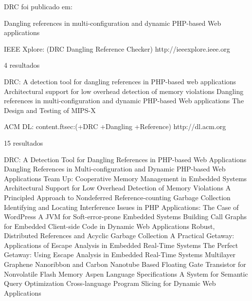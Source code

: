 DRC foi publicado em:

Dangling references in multi-configuration and dynamic PHP-based Web applications

IEEE Xplore: (DRC Dangling Reference Checker)
http://ieeexplore.ieee.org

4 resultados

DRC: A detection tool for dangling references in PHP-based web applications
Architectural support for low overhead detection of memory violations
Dangling references in multi-configuration and dynamic PHP-based Web applications
The Design and Testing of MIPS-X

ACM DL: content.ftsec:(+DRC +Dangling +Reference)
http://dl.acm.org

15 resultados

DRC: A Detection Tool for Dangling References in PHP-based Web Applications
Dangling References in Multi-configuration and Dynamic PHP-based Web Applications
Team Up: Cooperative Memory Management in Embedded Systems
Architectural Support for Low Overhead Detection of Memory Violations
A Principled Approach to Nondeferred Reference-counting Garbage Collection
Identifying and Locating Interference Issues in PHP Applications: The Case of WordPress
A JVM for Soft-error-prone Embedded Systems
Building Call Graphs for Embedded Client-side Code in Dynamic Web Applications
Robust, Distributed References and Acyclic Garbage Collection
A Practical Getaway: Applications of Escape Analysis in Embedded Real-Time Systems
The Perfect Getaway: Using Escape Analysis in Embedded Real-Time Systems
Multilayer Graphene Nanoribbon and Carbon Nanotube Based Floating Gate Transistor for Nonvolatile Flash Memory
Aspen Language Specifications
A System for Semantic Query Optimization
Cross-language Program Slicing for Dynamic Web Applications

